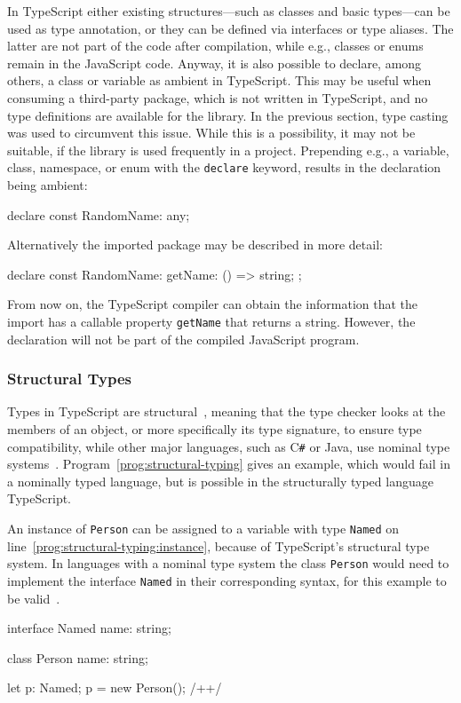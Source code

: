 In TypeScript either existing structures---such as classes and basic types---can be used as type annotation, or they can be defined via interfaces or type aliases. The latter are not part of the code after compilation, while e.g., classes or enums remain in the JavaScript code. Anyway, it is also possible to declare, among others, a class or variable as ambient in TypeScript. This may be useful when consuming a third-party package, which is not written in TypeScript, and no type definitions are available for the library. In the previous section, type casting was used to circumvent this issue. While this is a possibility, it may not be suitable, if the library is used frequently in a project. Prepending e.g., a variable, class, namespace, or enum with the \texttt{declare} keyword, results in the declaration being ambient:
\begin{JsCode}[numbers=none]
declare const RandomName: any;
\end{JsCode}
Alternatively the imported package may be described in more detail:
\begin{JsCode}[numbers=none]
declare const RandomName: {
  getName: () => string;
};
\end{JsCode}
From now on, the TypeScript compiler can obtain the information that the import has a callable property \texttt{getName} that returns a string. However, the declaration will not be part of the compiled JavaScript program.

\subsubsection{Structural Types}
\label{sec:ts-structural-types}

Types in TypeScript are structural~\cite[p.~11]{TypeScriptBook:Syed:2017}, meaning that the type checker looks at the members of an object, or more specifically its type signature, to ensure type compatibility, while other major languages, such as C\texttt{\#} or Java, use nominal type systems~\cite{TypeScriptHandbook:TypeCompatibility}. Program~\ref{prog:structural-typing} gives an example, which would fail in a nominally typed language, but is possible in the structurally typed language TypeScript.

\begin{program}
\caption{An instance of \texttt{Person} can be assigned to a variable with type \texttt{Named} on line~\ref{prog:structural-typing:instance}, because of TypeScript's structural type system. In languages with a nominal type system the class \texttt{Person} would need to implement the interface \texttt{Named} in their corresponding syntax, for this example to be valid~\cite{TypeScriptHandbook:TypeCompatibility}.}
\label{prog:structural-typing}
\begin{JsCode}
interface Named {
    name: string;
}

class Person {
    name: string;
}

let p: Named;
p = new Person(); /+\label{prog:structural-typing:instance}+/
\end{JsCode}
\end{program}

